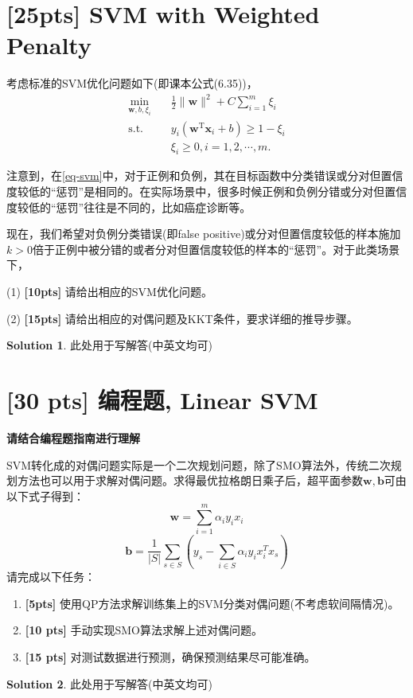 \documentclass[a4paper,UTF8]{article}
\theoremstyle{definition}
\newtheorem*{solution}{Solution}
\begin{document}
\section{[25pts] SVM with Weighted Penalty}
考虑标准的SVM优化问题如下(即课本公式(6.35))，
\begin{equation}
\label{eq-svm}
\begin{split}
\min_{\mathbf{w},b,\xi_i}& \quad \frac{1}{2} \lVert \mathbf{w} \rVert^2 + C\sum_{i=1}^m\xi_i\\
\text{s.t.}&  \quad y_i(\mathbf{w}^\mathrm{T}\mathbf{x}_i + b)\geq 1-\xi_i\\
& \quad \xi_i \geq 0, i = 1,2,\cdots,m.
\end{split}
\end{equation}

注意到，在\eqref{eq-svm}中，对于正例和负例，其在目标函数中分类错误或分对但置信度较低的“惩罚”是相同的。在实际场景中，很多时候正例和负例分错或分对但置信度较低的“惩罚”往往是不同的，比如癌症诊断等。

现在，我们希望对负例分类错误(即false positive)或分对但置信度较低的样本施加$k>0$倍于正例中被分错的或者分对但置信度较低的样本的“惩罚”。对于此类场景下，

(1) \textbf{[10pts]} 请给出相应的SVM优化问题。

(2) \textbf{[15pts]} 请给出相应的对偶问题及KKT条件，要求详细的推导步骤。

\begin{solution}此处用于写解答(中英文均可)

\end{solution}

\section{[30 pts] 编程题, Linear SVM}
\textbf{请结合编程题指南进行理解}

SVM转化成的对偶问题实际是一个二次规划问题，除了SMO算法外，传统二次规划方法也可以用于求解对偶问题。求得最优拉格朗日乘子后，超平面参数$\mathbf{w,b}$可由以下式子得到：
\begin{equation}
\mathbf{w} = \sum_{i=1}^m \alpha_i y_i x_i
\end{equation}
\begin{equation}
\mathbf{b} = \frac{1}{|S|}\sum_{s\in S} (y_s-\sum_{i\in S}\alpha_i y_i x_i^T x_s)
\end{equation}
请完成以下任务：
\begin{enumerate}[(1)]
	\item \textbf{[5pts]} 使用QP方法求解训练集上的SVM分类对偶问题(不考虑软间隔情况)。
	\item \textbf{[10 pts]} 手动实现SMO算法求解上述对偶问题。
	\item \textbf{[15 pts]} 对测试数据进行预测，确保预测结果尽可能准确。
\end{enumerate}

\begin{solution}
	此处用于写解答(中英文均可)
\end{solution}
\end{document}
